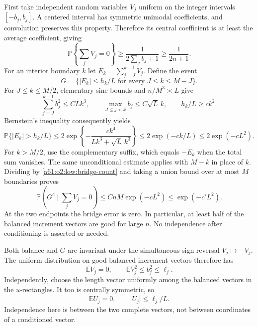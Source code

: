 \documentclass[11pt,letterpaper]{article}
\numberwithin{equation}{section}
\theoremstyle{remark}\newtheorem{remark}[theorem]{Remark}
\begin{document}
First take independent random variables $V_j$ uniform on the integer
intervals $[-b_j,b_j]$. A centered interval has symmetric unimodal
coefficients, and convolution preserves this property. Therefore its
central coefficient is at least the average coefficient, giving
\begin{equation}\label{a61:o2:low:bridge-count}
 \mathbb P\left\{\sum_jV_j=0\right\}
 \ge\frac1{2\sum_jb_j+1}\ge\frac1{2n+1}.
\end{equation}
For an interior boundary $k$ let
$E_k=\sum_{j=J}^{k-1}V_j$. Define the event
\[
 G=\{|E_k|\le h_k/L\text{ for every }J\le k\le M-J\}.
\]
For $J\le k\le M/2$, elementary sine bounds and $n/M^3\asymp L$ give
\[
 \sum_{j=J}^{k-1}b_j^2\le CLk^3,\qquad
 \max_{J\le j<k}b_j\le C\sqrt L\,k,\qquad
 h_k/L\ge ck^2.
\]
Bernstein's inequality consequently yields
\begin{equation}\label{a61:o2:low:bernstein}
 \mathbb P\{|E_k|>h_k/L\}
 \le 2\exp\left\{-\frac{ck^4}{Lk^3+\sqrt L\,k^3}\right\}
 \le 2\exp(-ck/L)\le 2\exp(-cL^2).
\end{equation}
For $k>M/2$, use the complementary suffix, which equals $-E_k$
when the total sum vanishes. The same unconditional estimate applies
with $M-k$ in place of $k$. Dividing by
\eqref{a61:o2:low:bridge-count} and taking a union bound over at most $M$
boundaries proves
\begin{equation}\label{a61:o2:low:good-probability}
 \mathbb P\left(G^c\mid\sum_jV_j=0\right)
 \le CnM\exp(-cL^2)\le\exp(-c'L^2).
\end{equation}
At the two endpoints the bridge error is zero. In particular, at least
half of the balanced increment vectors are good for large $n$.
No independence after conditioning is asserted or needed.

Both balance and $G$ are invariant under the simultaneous sign
reversal $V_j\mapsto-V_j$. The uniform distribution on good balanced
increment vectors therefore has
\begin{equation}\label{a61:o2:low:increment-moments}
 \mathbb E V_j=0,\qquad \mathbb E V_j^2\le b_j^2\le\ell_j.
\end{equation}
Independently, choose the length vector uniformly among the balanced
vectors in the $u$-rectangles. It too is centrally symmetric, so
\begin{equation}\label{a61:o2:low:length-moments}
 \mathbb E U_j=0,\qquad |U_j|\le\ell_j/L.
\end{equation}
Independence here is between the two complete vectors, not between
coordinates of a conditioned vector.
\end{document}
